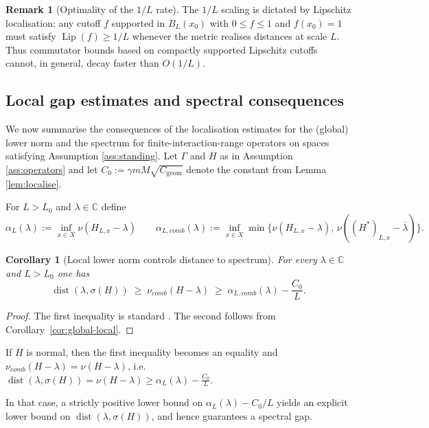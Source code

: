 \documentclass[11pt]{article}
\newtheorem{corollary}[theorem]{Corollary}
\theoremstyle{definition}
\newtheorem{remark}[theorem]{Remark}
\newcommand{\C}{\mathbb{C}}
\newcommand{\dist}{\operatorname{dist}}
\newcommand{\Lip}{\operatorname{Lip}}
\newcommand{\nuop}{\nu}
\begin{document}
\begin{remark}[Optimality of the $1/L$ rate]\label{rem:optimality}
The $1/L$ scaling is dictated by Lipschitz localisation: any cutoff $f$ supported in $B_L(x_0)$ with $0\le f\le 1$ and $f(x_0)=1$ must satisfy $\Lip(f)\ge 1/L$ whenever the metric realises distances at scale $L$. Thus commutator bounds based on compactly supported Lipschitz cutoffs cannot, in general, decay faster than $O(1/L)$.
\end{remark}

\subsection{Local gap estimates and spectral consequences}

We now summarise the consequences of the localisation estimates for the
(global) lower norm and the spectrum for finite-interaction-range operators on spaces satisfying Assumption \ref{ass:standing}. Let $\Gamma$ and $H$ as in Assumption \ref{ass:operators} and let $C_0:=\gamma mM\sqrt{C_{\mathrm{geom}}}$ denote the constant from Lemma \ref{lem:localise}.

For $L>L_0$ and $\lambda\in\C$ define
\[
  \alpha_L(\lambda)
  := \inf_{x\in X}\nuop(H_{L,x}-\lambda)\qquad
  \alpha_{L,comb}(\lambda)
  := \inf_{x\in X}\min\bigl\{\nu(H_{L,x}-\lambda),\,\nu((H^*)_{L,x}-\overline{\lambda})\bigr\}.
\]

\begin{corollary}[Local lower norm controls distance to spectrum]
\label{thm:local-gap-general}
For every $\lambda\in\C$ and $L>L_0$ one has
\[
  \dist(\lambda,\sigma(H))
  \;\ge\;
  \nu_{comb}(H-\lambda)
  \;\ge\;
  \alpha_{L, comb}(\lambda)-\frac{C_0}{L}.
\]
\end{corollary}

\begin{proof}
The first inequality is standard \cite{Lindner2006, RabinovichRochSilbermann2004}. The second follows from
Corollary~\ref{cor:global-local}.
\end{proof}
\noindent
If $H$ is normal, then the first inequality becomes an equality and $\nu_{comb}(H-\lambda)=\nu(H-\lambda)$, i.e. $\dist(\lambda,\sigma(H))=\nuop(H-\lambda) \geq \alpha_{L}(\lambda)-\frac{C_0}{L}$. 

In that case, a strictly positive lower bound on
$\alpha_L(\lambda)-C_0/L$ yields an explicit lower bound on
$\dist(\lambda,\sigma(H))$, and hence guarantees a spectral gap.
\end{document}
